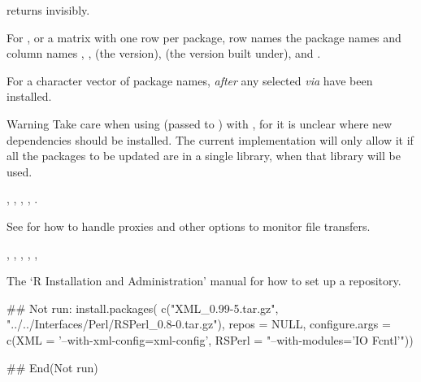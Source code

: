 %
\begin{Value}
 returns  invisibly.

For ,  or a matrix with one row per
package, row names the package names and column names
, ,  (the version),
 (the version built under),  and
.

For  a character vector of package names,
\emph{after} any selected \emph{via}  have been installed.
\end{Value}
%
\begin{Section}{Warning}
Take care when using  (passed to
) with ,
for it is unclear where new dependencies should be installed.  The
current implementation will only allow it if all the packages to be
updated are in a single library, when that library will be used.
\end{Section}
%
\begin{SeeAlso}\relax
{},
, ,
, .

See  for how to handle proxies and
other options to monitor file transfers.

, , ,
, , 

The `R Installation and Administration' manual for how to 
set up a repository.
\end{SeeAlso}
%
\begin{Examples}
\begin{ExampleCode}

## Not run: 
install.packages(
    c("XML_0.99-5.tar.gz",
      "../../Interfaces/Perl/RSPerl_0.8-0.tar.gz"),
    repos = NULL,
    configure.args = c(XML = '--with-xml-config=xml-config',
                       RSPerl = "--with-modules='IO Fcntl'"))

## End(Not run)
\end{ExampleCode}
\end{Examples}
